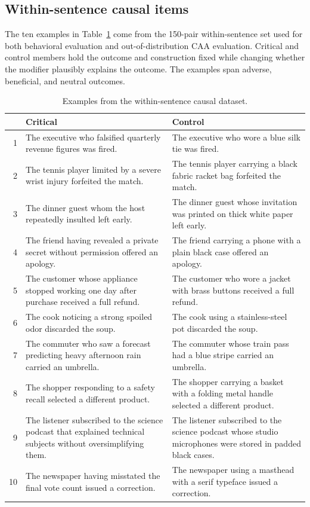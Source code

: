 \subsection{Within-sentence causal items}
\label{app:within-sentence-examples}

The ten examples in Table~\ref{tab:within-sentence-examples} come from the 150-pair within-sentence set used for
both behavioral evaluation and out-of-distribution CAA evaluation. Critical and
control members hold the outcome and construction fixed while changing whether
the modifier plausibly explains the outcome. The examples span adverse,
beneficial, and neutral outcomes.

\begin{table}[htbp]
\centering
\footnotesize
\setlength{\tabcolsep}{4pt}
\renewcommand{\arraystretch}{1.08}
\caption{Examples from the within-sentence causal dataset.}
\label{tab:within-sentence-examples}
\begin{tabular}{@{}r p{} p{}@{}}
\toprule
& Critical & Control \\
\midrule
1 & The executive who falsified quarterly revenue figures was fired. & The executive who wore a blue silk tie was fired. \\
2 & The tennis player limited by a severe wrist injury forfeited the match. & The tennis player carrying a black fabric racket bag forfeited the match. \\
3 & The dinner guest whom the host repeatedly insulted left early. & The dinner guest whose invitation was printed on thick white paper left early. \\
4 & The friend having revealed a private secret without permission offered an apology. & The friend carrying a phone with a plain black case offered an apology. \\
5 & The customer whose appliance stopped working one day after purchase received a full refund. & The customer who wore a jacket with brass buttons received a full refund. \\
6 & The cook noticing a strong spoiled odor discarded the soup. & The cook using a stainless-steel pot discarded the soup. \\
7 & The commuter who saw a forecast predicting heavy afternoon rain carried an umbrella. & The commuter whose train pass had a blue stripe carried an umbrella. \\
8 & The shopper responding to a safety recall selected a different product. & The shopper carrying a basket with a folding metal handle selected a different product. \\
9 & The listener subscribed to the science podcast that explained technical subjects without oversimplifying them. & The listener subscribed to the science podcast whose studio microphones were stored in padded black cases. \\
10 & The newspaper having misstated the final vote count issued a correction. & The newspaper using a masthead with a serif typeface issued a correction. \\
\bottomrule
\end{tabular}
\end{table}

